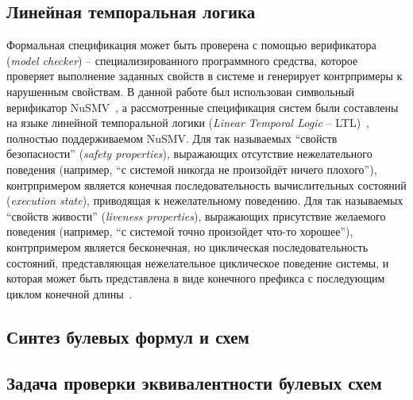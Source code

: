 
\subsection{Линейная темпоральная логика}%
\label{sub:ltl}


Формальная спецификация может быть проверена с помощью верификатора (\textit{model checker}) \--- специализированного программного средства, которое проверяет выполнение заданных свойств в системе и генерирует контрпримеры к нарушенным свойствам.
В данной работе был использован символьный верификатор NuSMV~\cite{NuSMV}, а рассмотренные спецификация систем были составлены на языке линейной темпоральной логики (\textit{Linear Temporal Logic} \--- LTL)~\cite{ltl}, полностью поддерживаемом NuSMV\@.
Для так называемых \enquote{свойств безопасности} (\textit{safety properties}), выражающих отсутствие нежелательного поведения (например, \enquote{с системой никогда не произойдёт ничего плохого}), контрпримером является конечная последовательность вычислительных состояний (\textit{execution state}), приводящая к нежелательному поведению.
Для так называемых \enquote{свойств живости} (\textit{liveness properties}), выражающих присутствие желаемого поведения (например, \enquote{с системой точно произойдет что-то хорошее}), контрпримером является бесконечная, но циклическая последовательность состояний, представляющая нежелательное циклическое поведение системы, и которая может быть представлена в виде конечного префикса с последующим циклом конечной длины~\cite{clarke1999}.



\subsection{Синтез булевых формул и схем}
\label{sub:circuits-synthesis}



\subsection{Задача проверки эквивалентности булевых схем}
\label{sub:lec}

